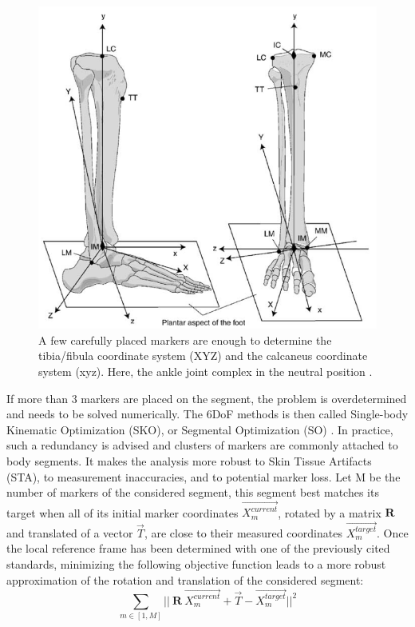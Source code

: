 \begin{figure}[!ht]
	\centering
	\def\svgwidth{1\columnwidth}
	\fontsize{10pt}{10pt}\selectfont
	\includegraphics[width=0.7\linewidth]{"../Chap2/Figures/ISBaxis.PNG"}
	\caption{A few carefully placed markers are enough to determine the tibia/fibula coordinate system (XYZ) and the calcaneus coordinate system (xyz). Here, the ankle joint complex in the neutral position \cite{Wu2002}.}
	\label{fig_isb}
\end{figure}

If more than 3 markers are placed on the segment, the problem is overdetermined and needs to be solved numerically. The 6DoF methods is then called Single-body Kinematic Optimization (SKO), or Segmental Optimization (SO) \cite{Lu1999}. In practice, such a redundancy is advised and clusters of markers are commonly attached to body segments. It makes the analysis more robust to Skin Tissue Artifacts (STA), to measurement inaccuracies, and to potential marker loss. Let M be the number of markers of the considered segment, this segment best matches its target when all of its initial marker coordinates $\overrightarrow{X^{current}_m}$, rotated by a matrix $\textbf{R}$ and translated of a vector $\overrightarrow{T}$, are close to their measured coordinates $\overrightarrow{X^{target}_m}$. Once the local reference frame has been determined with one of the previously cited standards, minimizing the following objective function leads to a more robust approximation of the rotation and translation of the considered segment: 
\begin{equation}
  \sum_{m \in [1,M]}
  ||\ \textbf{R} \ \overrightarrow{X^{current}_m} + \overrightarrow{T} - \overrightarrow{X^{target}_m} ||^2
\end{equation} 


